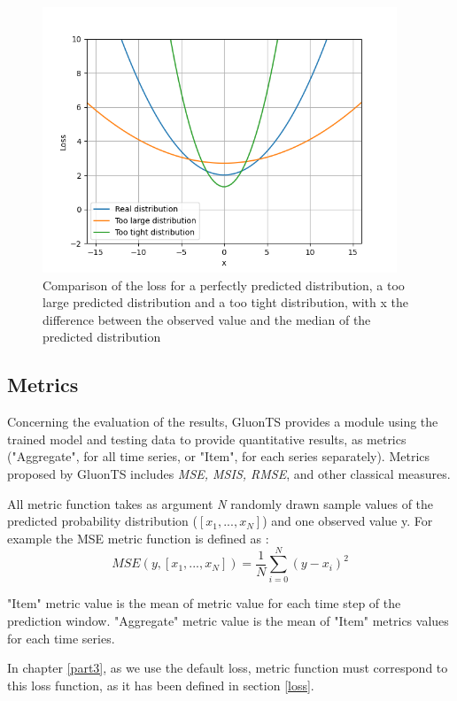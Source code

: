 \begin{figure}[H]
    \centering
    \includegraphics[width=400px]{distribution_comp.png}
    \caption{Comparison of the loss for a perfectly predicted distribution, a too large predicted distribution and a too tight distribution, with x the difference between the observed value and the median of the predicted distribution}
    \label{fig:distrib_comp}
\end{figure}


\subsection{Metrics} \label{metrics}

Concerning the evaluation of the results, GluonTS provides a module using the trained model and testing data to provide quantitative results, as metrics ("Aggregate", for all time series, or "Item", for each series separately). Metrics proposed by GluonTS includes \textit{MSE, MSIS, RMSE}, and other classical measures.

All metric function takes as argument \textit{N} randomly drawn sample values of the predicted probability distribution ($[{x_1},...,{x_N}]$) and one observed value y. 
For example the MSE metric function is defined as :
\begin{equation}
    MSE(y,[{x_1},...,{x_N}]) = \frac{1}{N}\sum_{i=0}^{N}(y-{x_i})^2
\end{equation}

"Item" metric value is the mean of metric value for each time step of the prediction window.
"Aggregate" metric value is the mean of "Item" metrics values for each time series.

In chapter \ref{part3}, as we use the default loss, metric function must correspond to this loss function, as it has been defined in section \ref{loss}. 

